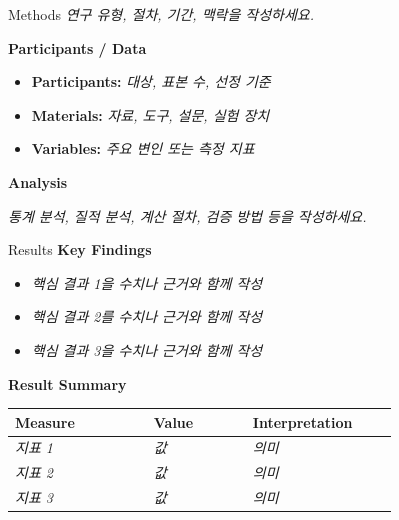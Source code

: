 \documentclass[a0paper,portrait]{KNUE_baposter}
\newcommand{\TemplateText}[1]{{\color{aaublue2}\itshape #1}}
\begin{document}
\begin{poster}
\begin{posterbox}[name=methods,column=1,below=abstract]{Methods}
\scriptsize
\TemplateText{연구 유형, 절차, 기간, 맥락을 작성하세요.}

\vspace{0.6em}
\footnotesize
\textbf{Participants / Data}

\scriptsize
\begin{itemize}
\item \textbf{Participants:} \TemplateText{대상, 표본 수, 선정 기준}
\item \textbf{Materials:} \TemplateText{자료, 도구, 설문, 실험 장치}
\item \textbf{Variables:} \TemplateText{주요 변인 또는 측정 지표}
\end{itemize}

\vspace{0.6em}
\footnotesize
\textbf{Analysis}

\scriptsize
\TemplateText{통계 분석, 질적 분석, 계산 절차, 검증 방법 등을 작성하세요.}
\end{posterbox}

%
\begin{posterbox}[name=results,column=2,below=boxlayoutguide]{Results}
\footnotesize
\textbf{Key Findings}

\scriptsize
\begin{itemize}
\item \TemplateText{핵심 결과 1을 수치나 근거와 함께 작성}
\item \TemplateText{핵심 결과 2를 수치나 근거와 함께 작성}
\item \TemplateText{핵심 결과 3을 수치나 근거와 함께 작성}
\end{itemize}

\vspace{0.6em}
\footnotesize
\textbf{Result Summary}

\scriptsize
\begin{center}
\begin{tabular}{p{0.28\linewidth}p{0.20\linewidth}p{0.28\linewidth}}
\toprule
\textbf{Measure} & \textbf{Value} & \textbf{Interpretation} \\
\midrule
\TemplateText{지표 1} & \TemplateText{값} & \TemplateText{의미} \\
\TemplateText{지표 2} & \TemplateText{값} & \TemplateText{의미} \\
\TemplateText{지표 3} & \TemplateText{값} & \TemplateText{의미} \\
\bottomrule
\end{tabular}
\end{center}
\end{posterbox}


\end{poster}
\end{document}
